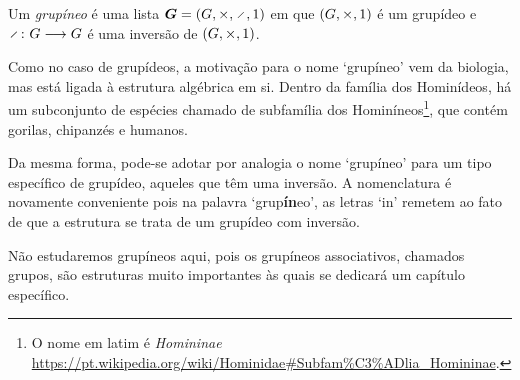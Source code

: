 \begin{definition}
Um \emph{grupíneo} é uma lista $\bm G = (G,\times,\div,\id)$ em que $(G,\times,1)$ é um grupídeo e $\fun{\div}{G}{G}$ é uma inversão de $(G,\times,1)$.
\end{definition}

Como no caso de grupídeos, a motivação para o nome `grupíneo' vem da biologia, mas está ligada à estrutura algébrica em si. Dentro da família dos Hominídeos, há um subconjunto de espécies chamado de subfamília dos Hominíneos\footnote{O nome em latim é \textit{Homininae} \url{https://pt.wikipedia.org/wiki/Hominidae\#Subfam\%C3\%ADlia_Homininae}.}, que contém gorilas, chipanzés e humanos.

Da mesma forma, pode-se adotar por analogia o nome `grupíneo' para um tipo específico de grupídeo, aqueles que têm uma inversão. A nomenclatura é novamente conveniente pois na palavra `grup\textbf{ín}eo', as letras `in' remetem ao fato de que a estrutura se trata de um grupídeo com inversão.

Não estudaremos grupíneos aqui, pois os grupíneos associativos, chamados grupos, são estruturas muito importantes às quais se dedicará um capítulo específico.

